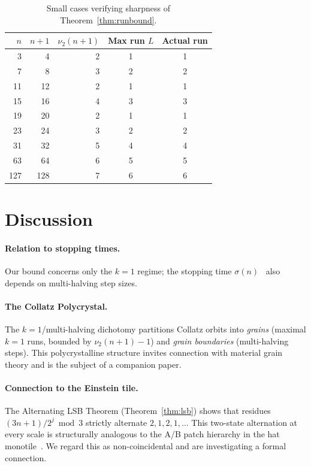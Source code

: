 \documentclass[12pt]{article}
\newcommand{\vp}{\nu_2}
\begin{document}
\begin{table}[h]
\centering
\begin{tabular}{rrrcc}
\hline
$n$ & $n+1$ & $\vp(n+1)$ & Max run $L$ & Actual run \\
\hline
3   & 4   & 2 & 1 & 1 \\
7   & 8   & 3 & 2 & 2 \\
11  & 12  & 2 & 1 & 1 \\
15  & 16  & 4 & 3 & 3 \\
19  & 20  & 2 & 1 & 1 \\
23  & 24  & 3 & 2 & 2 \\
31  & 32  & 5 & 4 & 4 \\
63  & 64  & 6 & 5 & 5 \\
127 & 128 & 7 & 6 & 6 \\
\hline
\end{tabular}
\caption{Small cases verifying sharpness of Theorem~\ref{thm:runbound}.}
\label{tab:small}
\end{table}

\section{Discussion}

\paragraph{Relation to stopping times.}
Our bound concerns only the $k=1$ regime; the stopping time
$\sigma(n)$~\cite{Terras1976} also depends on multi-halving step sizes.

\paragraph{The Collatz Polycrystal.}
The $k=1$/multi-halving dichotomy partitions Collatz orbits into
\emph{grains} (maximal $k=1$ runs, bounded by $\vp(n+1)-1$) and
\emph{grain boundaries} (multi-halving steps).  This
polycrystalline structure invites connection with material grain theory
and is the subject of a companion paper.

\paragraph{Connection to the Einstein tile.}
The Alternating LSB Theorem (Theorem~\ref{thm:lsb}) shows that residues
$(3n+1)/2^j\bmod 3$ strictly alternate $2,1,2,1,\ldots$ This two-state
alternation at every scale is structurally analogous to the A/B patch
hierarchy in the hat monotile~\cite{SmithMyers2023}.  We regard this as
non-coincidental and are investigating a formal connection.
\end{document}
